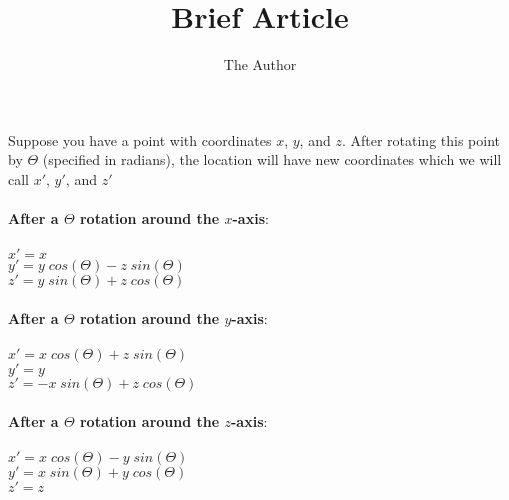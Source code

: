 \documentclass[11pt]{amsart}
\title{Brief Article}
\author{The Author}
\begin{document}

\noindent
Suppose you have a point with coordinates $x$, $y$, and $z$. After rotating this point by  $\Theta$ (specified in radians), the location will have new coordinates which we will call $x'$, $y'$, and $z'$ \\ \\

\noindent
{\bf After a $\Theta$ rotation around the $x$-axis}: \\ \\

\noindent
\hspace*{1in} $x' = x$ \\
\hspace*{1in} $y' = y \; cos(\Theta) - z \; sin(\Theta)$ \\
\hspace*{1in} $z' = y \; sin(\Theta) + z \; cos(\Theta)$ \\ \\

\noindent
{\bf After a $\Theta$ rotation around the $y$-axis}: \\ \\

\noindent
\hspace*{1in} $x' = x \; cos(\Theta) + z \; sin(\Theta)$ \\
\hspace*{1in} $y' = y$ \\
\hspace*{1in} $z' =-x \; sin(\Theta) + z \; cos(\Theta)$ \\ \\

\noindent
{\bf After a $\Theta$ rotation around the $z$-axis}: \\ \\

\noindent
\hspace*{1in} $x' =  x \; cos(\Theta) - y \; sin(\Theta)$ \\
\hspace*{1in} $y' = x \; sin(\Theta) + y \; cos(\Theta)$ \\
\hspace*{1in} $z' = z$
\end{document}
